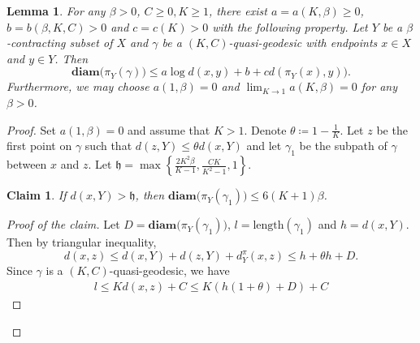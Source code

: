 \documentclass[10pt,a4paper]{amsart}
\newtheorem{lem}{Lemma}
\newtheorem{claim}{Claim}
\newcommand{\diam }[1]{{\textbf{diam}\big(#1\big)}}
\begin{document}
\begin{lem}\label{projLip}
	For any $\beta>0$, $C\ge 0, K\ge 1$, there exist $a = a(K, \beta) \ge 0$, $b = b(\beta, K, C) > 0$ and $c = c(K) > 0$ with the following property. 
	Let $Y$ be a $\beta$-contracting subset of $X$ and $\gamma$ be a $(K, C)$-quasi-geodesic with endpoints $x\in X$ and $y\in Y$. Then $$\diam {\pi_{Y}(\gamma)} \le a \log d(x, y) + b + c d(\pi_Y(x), y)).$$ Furthermore,  we may choose $a(1, \beta)=0$ and $\lim_{K\to 1} a(K, \beta) = 0$ for any $\beta > 0$. 
\end{lem}

\begin{proof}
	Set $a(1, \beta)=0$ and assume that $K>1$. Denote $\theta \coloneqq 1-\frac{1}{K}$.
	Let $z$ be the first point on $\gamma$ such that $d(z, Y) \le  \theta d(x, Y)$ and let $\gamma_1$ be the subpath of $\gamma$ between $x$ and $z$. Let $\mathfrak h = \max\left\{\frac{2K^2\beta}{K-1}, \frac{CK}{K^2-1}, 1\right\}$.
	\begin{claim}
		If $d(x, Y) > \mathfrak h$, then $\diam{\pi_Y(\gamma_1)} \le 6(K + 1) \beta$.
	\end{claim}
	\begin{proof}[Proof of the claim]
		Let $D = \diam{\pi_Y(\gamma_1)}$, $l = \mathrm{length}(\gamma_1)$ and $h = d(x, Y)$. Then by triangular inequality, $$d(x, z) \le d(x, Y) + d(z, Y) + d^{\pi}_Y(x, z) \le h + \theta h + D.$$ 
		Since $\gamma$ is a $(K, C)$-quasi-geodesic, we have \begin{align}\label{lboundEq}
			l \le K d(x, z) + C \le K(h(1+\theta) + D) + C
		\end{align}
		

\end{proof}
\end{proof}
\end{document}

